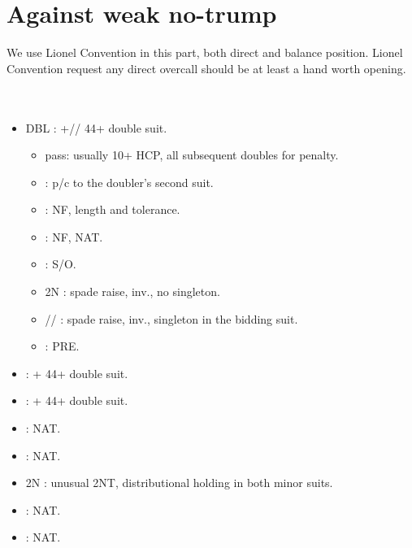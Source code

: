 \documentclass[12pt,twoside,a5paper]{report}%
\begin{document}
	\section*{Against weak no-trump}
		We use Lionel Convention in this part, both direct and balance position. Lionel Convention request any direct overcall should be at least a hand worth opening.\\
		\\
		\\
		\begin{itemize}
		\renewcommand{\labelitemi}{--}
			\item DBL : \sp{}+\he{}/\di{}/\cl{} 44+ double suit.
				\begin{itemize}
				\renewcommand{\labelitemi}{--}
					\item pass: usually 10+ HCP, all subsequent doubles for penalty.
					\item {} : p/c to the doubler's second suit.
					\item {} : NF, \di{} length and \he{} tolerance.
					\item {} : NF, NAT.
					\item {} : S/O.
					\item 2N : spade raise, inv., no singleton.
					\item {}/\di{}/\he{} : spade raise, inv., singleton in the bidding suit.
					\item {} : PRE.
				\end{itemize}
			\item {} : \he{}+\cl{} 44+ double suit.
			\item {} : \he{}+\di{} 44+ double suit.
			\item {} : NAT.
			\item {} : NAT.
			\item 2N : unusual 2NT, distributional holding in both minor suits.
			\item {} : NAT.
			\item {} : NAT.
		\end{itemize}
		
\end{document}

